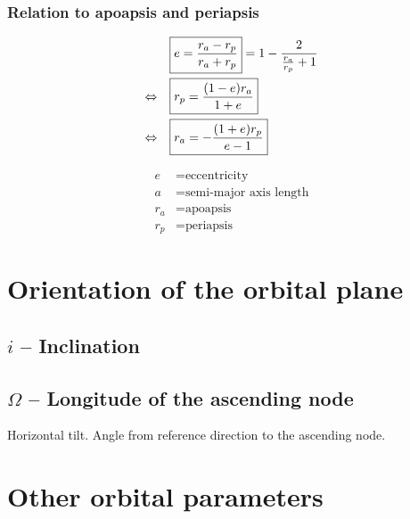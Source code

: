 \documentclass{article}
\begin{document}
\subsubsection{Relation to apoapsis and periapsis}
\begin{minipage}{0.54\textwidth}
    \begingroup
    \addtolength{\jot}{1em}
    \begin{align}
        \Aboxed{& e = \frac{r_a - r_p}{r_a + r_p}} = 1 - \frac{2}{\frac{r_a}{r_p} + 1} \\
        \Leftrightarrow \quad \Aboxed{& r_p = \frac{(1-e)r_a}{1+e}} \\
        \Leftrightarrow \quad \Aboxed{& r_a = -\frac{(1+e)r_p}{e-1}}
    \end{align}
    \endgroup
\end{minipage}\hfill
\begin{minipage}{0.36\textwidth}
    \begin{align*}
        e &= \text{eccentricity} \\
        a &= \hyperref[sec:semimajor]{\text{semi-major axis length}} \\
        r_a &= \text{apoapsis} \\
        r_p &= \text{periapsis}
    \end{align*}
\end{minipage}



\section{Orientation of the orbital plane}

\subsection{$i$ -- Inclination}


\subsection{$\Omega$ -- Longitude of the ascending node}
Horizontal tilt. Angle from reference direction to the ascending node.


\section{Other orbital parameters}
\end{document}
